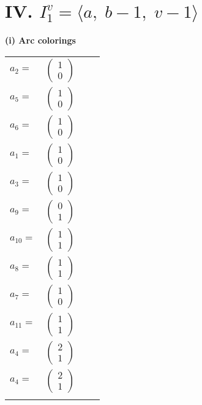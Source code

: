 \documentclass[1p]{elsarticle_modified}
\theoremstyle{definition}
\begin{document}
\centering \section*{IV. $I^v_{1}= \langle a,\;b-1,\;v-1 \rangle$}
\flushleft \textbf{(i) Arc colorings}\\
\begin{tabular}{m{7pt} m{180pt} m{7pt} m{180pt} }
\flushright $a_{2}=$&$\begin{pmatrix}1\\0\end{pmatrix}$ \\
\flushright $a_{5}=$&$\begin{pmatrix}1\\0\end{pmatrix}$ \\
\flushright $a_{6}=$&$\begin{pmatrix}1\\0\end{pmatrix}$ \\
\flushright $a_{1}=$&$\begin{pmatrix}1\\0\end{pmatrix}$ \\
\flushright $a_{3}=$&$\begin{pmatrix}1\\0\end{pmatrix}$ \\
\flushright $a_{9}=$&$\begin{pmatrix}0\\1\end{pmatrix}$ \\
\flushright $a_{10}=$&$\begin{pmatrix}1\\1\end{pmatrix}$ \\
\flushright $a_{8}=$&$\begin{pmatrix}1\\1\end{pmatrix}$ \\
\flushright $a_{7}=$&$\begin{pmatrix}1\\0\end{pmatrix}$ \\
\flushright $a_{11}=$&$\begin{pmatrix}1\\1\end{pmatrix}$ \\
\flushright $a_{4}=$&$\begin{pmatrix}2\\1\end{pmatrix}$\\ \flushright $a_{4}=$&$\begin{pmatrix}2\\1\end{pmatrix}$\\&\end{tabular}
\end{document}
